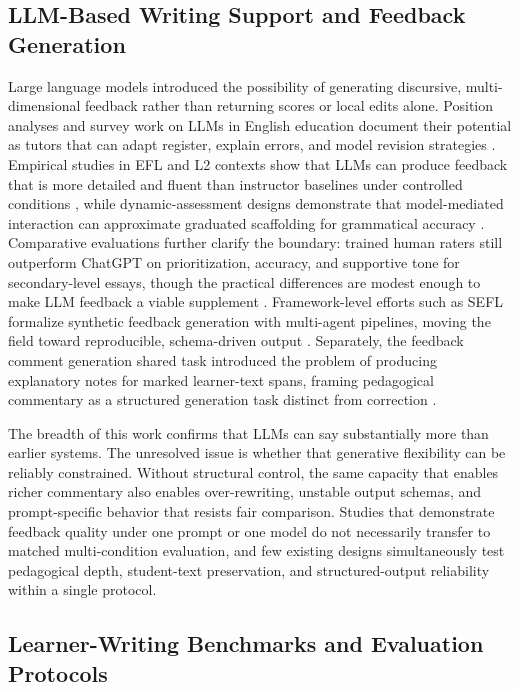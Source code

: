 \documentclass[preprint,12pt]{elsarticle}
\begin{document}
\subsection{LLM-Based Writing Support and Feedback Generation}

Large language models introduced the possibility of generating discursive, multi-dimensional feedback rather than returning scores or local edits alone. Position analyses and survey work on LLMs in English education document their potential as tutors that can adapt register, explain errors, and model revision strategies \cite{ye2025position,chu2025agents}. Empirical studies in EFL and L2 contexts show that LLMs can produce feedback that is more detailed and fluent than instructor baselines under controlled conditions \cite{dai2023feedback,han2024llm}, while dynamic-assessment designs demonstrate that model-mediated interaction can approximate graduated scaffolding for grammatical accuracy \cite{jaganov2025dynamic}. Comparative evaluations further clarify the boundary: trained human raters still outperform ChatGPT on prioritization, accuracy, and supportive tone for secondary-level essays, though the practical differences are modest enough to make LLM feedback a viable supplement \cite{steiss2024comparing}. Framework-level efforts such as SEFL formalize synthetic feedback generation with multi-agent pipelines, moving the field toward reproducible, schema-driven output \cite{zhang2025sefl}. Separately, the feedback comment generation shared task introduced the problem of producing explanatory notes for marked learner-text spans, framing pedagogical commentary as a structured generation task distinct from correction \cite{nagata2021fcg}.

The breadth of this work confirms that LLMs can say substantially more than earlier systems. The unresolved issue is whether that generative flexibility can be reliably constrained. Without structural control, the same capacity that enables richer commentary also enables over-rewriting, unstable output schemas, and prompt-specific behavior that resists fair comparison. Studies that demonstrate feedback quality under one prompt or one model do not necessarily transfer to matched multi-condition evaluation, and few existing designs simultaneously test pedagogical depth, student-text preservation, and structured-output reliability within a single protocol.

\subsection{Learner-Writing Benchmarks and Evaluation Protocols}
\end{document}
